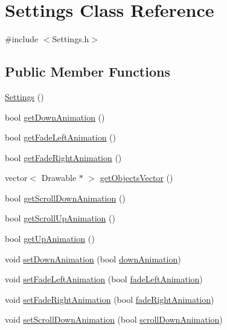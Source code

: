 \hypertarget{classSettings}{}\section{Settings Class Reference}
\label{classSettings}


{\ttfamily \#include $<$Settings.\+h$>$}

\subsection*{Public Member Functions}
\begin{DoxyCompactItemize}
\item 
\hyperlink{classSettings_ab7169a6eefce79566dd07db3b1e5e967}{Settings} ()
\item 
bool \hyperlink{classSettings_ac9ecd28f72588f8481840c83de4f9905}{get\+Down\+Animation} ()
\item 
bool \hyperlink{classSettings_ab111ded63b457ef62ba4d3c2b5fd505f}{get\+Fade\+Left\+Animation} ()
\item 
bool \hyperlink{classSettings_aac9a6dcb72f803ed1a8c60815a57d120}{get\+Fade\+Right\+Animation} ()
\item 
vector$<$ Drawable $\ast$ $>$ \hyperlink{classSettings_a3f4a91c18915f999622a98b88d815007}{get\+Objects\+Vector} ()
\item 
bool \hyperlink{classSettings_ac66a0a23351662d86679addd4b058e1a}{get\+Scroll\+Down\+Animation} ()
\item 
bool \hyperlink{classSettings_a6681474ab3a4d082a1ccafb0015393db}{get\+Scroll\+Up\+Animation} ()
\item 
bool \hyperlink{classSettings_a01ae940ebfaa263e7178d38740bdd332}{get\+Up\+Animation} ()
\item 
void \hyperlink{classSettings_a38d541933e0786f211e6296b03d9f002}{set\+Down\+Animation} (bool \hyperlink{classSettings_a3ca98c2832652c799e4156c2cd9870b8}{down\+Animation})
\item 
void \hyperlink{classSettings_abd4b4ba65f26dc0f542c74dd977404a6}{set\+Fade\+Left\+Animation} (bool \hyperlink{classSettings_a9fc3029b2d7ea3627cfb337963e5e517}{fade\+Left\+Animation})
\item 
void \hyperlink{classSettings_aef8cac960c79056f81bcc62d58332555}{set\+Fade\+Right\+Animation} (bool \hyperlink{classSettings_a361d40b16e3a783d7ac48008a825da86}{fade\+Right\+Animation})
\item 
void \hyperlink{classSettings_a4b512ec5f1d7a5440c5aa81ebb93dd63}{set\+Scroll\+Down\+Animation} (bool \hyperlink{classSettings_ae02e88347857994296383bea194f3fdf}{scroll\+Down\+Animation})

\end{DoxyCompactItemize}
